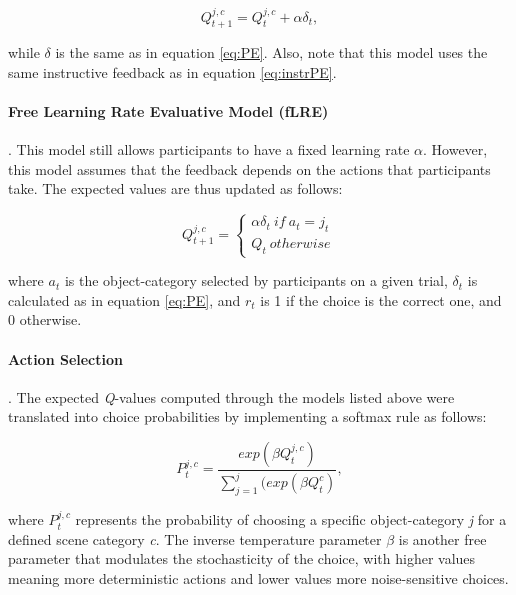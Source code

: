\documentclass[a4paper,12pt]{article} 			%
\begin{document}
\begin{equation}
{Q}_{t+1}^{j,c} = {Q}_{t}^{j,c}  + {\alpha} \delta_{t},
\label{eq:fLRI}
\end{equation}

\noindent
while $\delta$ is the same as in equation \ref{eq:PE}. Also, note that this model uses the same instructive feedback as in equation \ref{eq:instrPE}.

\paragraph{Free Learning Rate Evaluative Model (fLRE)}. This model still allows participants to have a fixed learning rate $\alpha$. However, this model assumes that the feedback depends on the actions that participants take. The expected values are thus updated as follows:


\begin{equation}
{Q}_{t+1}^{j,c} = \begin{cases}
{\alpha} \delta_{t}\ if  \ a_t = j_t \  \\ 
{Q}_{t} \ otherwise
\end{cases}
\end{equation}

\noindent
where $a_t$ is the object-category selected by participants on a given trial, $\delta_{t}$ is calculated as in equation \ref{eq:PE}, and $r_t$ is 1 if the choice is the correct one, and 0 otherwise. 

\paragraph{Action Selection}. The expected \textit{Q}-values computed through the models listed above were translated into choice probabilities by implementing a softmax rule as follows: 

\begin{equation}
P_t^{j,c} = \dfrac{ exp({\beta} {Q}_t^{j,c})   }
{ \sum_{j=1}^j (exp({\beta} {Q}_t^c) },  
\end{equation}

\noindent
where $P_t^{j,c}$ represents the probability of choosing a specific object-category \textit{j} for a defined scene category \textit{c}. The inverse temperature parameter $\beta$ is another free parameter that modulates the stochasticity of the choice, with higher values meaning more deterministic actions and lower values more noise-sensitive choices. 
\end{document}
